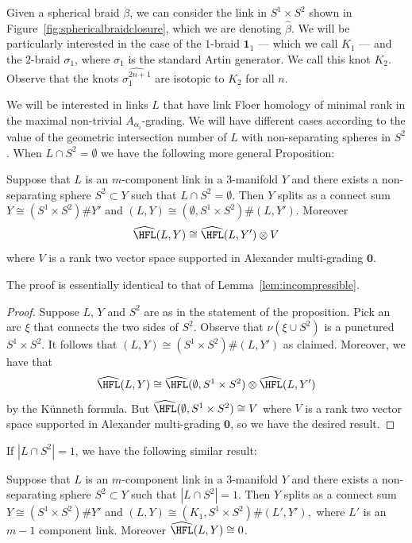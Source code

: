 \documentclass{amsart}
\theoremstyle{definition}
\theoremstyle{remark}
\numberwithin{equation}{section}
\begin{document}
Given a spherical braid $\beta$, we can consider the link in $S^1\times S^2$ shown in Figure~\ref{fig:sphericalbraidclosure}, which we are denoting $\widehat{\beta}$. We will be particularly interested in the case of the $1$-braid $\mathbf{1}_1$ --- which we call $K_1$ --- and the $2$-braid $\sigma_1$, where $\sigma_1$ is the standard Artin generator. We call this knot $K_2$. Observe that the knots $\widehat{\sigma_1^{2n+1}}$ are isotopic to $K_2$ for all $n$.

We will be interested in links $L$ that have link Floer homology of minimal rank in the maximal non-trivial $A_{\alpha_i}$-grading. We will have different cases according to the value of the geometric intersection number of $L$ with non-separating spheres in $S^2$. When $L\cap S^2=\emptyset$ we have the following more general Proposition:

\begin{proposition}\label{prop:K1comp}
Suppose that $L$ is an $m$-component link in a $3$-manifold $Y$ and there exists a non-separating sphere $S^2 \subset Y$ such that $L\cap S^2=\emptyset$. Then $Y$ splits as a connect sum $Y\cong (S^1\times S^2)\#Y'$ and ${(L,Y)\cong (\emptyset,S^1\times S^2)\#(L,Y')}$. Moreover $$\widehat{\HFL}(L,Y)\cong \widehat{\HFL}(L,Y')\otimes V$$ where $V$ is a rank two vector space supported in Alexander multi-grading $\mathbf{0}$.
\end{proposition}
   The proof is essentially identical to that of Lemma~\ref{lem:incompressible}.
\begin{proof}
Suppose $L$, $Y$ and $S^2$ are as in the statement of the proposition. Pick an arc $\xi$ that connects the two sides of $S^2$. Observe that $\nu(\xi\cup S^2)$ is a punctured $S^1\times S^2$. It follows that $(L,Y)\cong (S^1\times S^2)\#(L,Y')$ as claimed. Moreover, we have that  $$\widehat{\HFL}(L,Y)\cong\widehat{\HFL}(\emptyset, S^1\times S^2)\otimes\widehat{\HFL}(L,Y')$$ by the K\"unneth formula. But $\widehat{\HFL}(\emptyset, S^1\times S^2)\cong V$ where $V$ is a rank two vector space supported in Alexander multi-grading $\mathbf{0}$, so we have the desired result.
\end{proof}





If $|L\cap S^2|=1$, we have the following similar result:

\begin{proposition}\label{lem:K1component}
Suppose that $L$ is an $m$-component link in a $3$-manifold $Y$ and there exists a non-separating sphere $S^2 \subset Y$ such that $|L\cap S^2|=1$. Then $Y$ splits as a connect sum $Y\cong (S^1\times S^2)\#Y'$ and ${(L,Y)\cong (K_1,S^1\times S^2)\#(L',Y'),}$ where $L'$ is an $m-1$ component link. Moreover $\widehat{\HFL}(L,Y)\cong0$.
\end{proposition}
\end{document}
